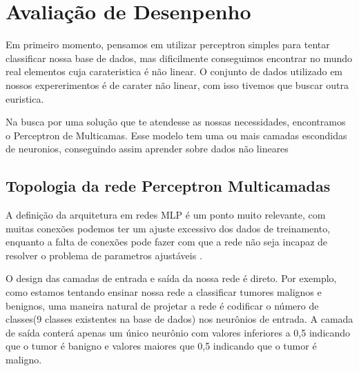 \documentclass[conference]{IEEEtran}
\begin{document}
	
	
\section{Avaliação de Desenpenho}
    
    Em primeiro momento, pensamos em utilizar perceptron simples para tentar classificar nossa base de dados, mas 
    dificilmente conseguimos encontrar no mundo real elementos cuja carateristica é não linear. O conjunto de dados utilizado em nossos expererimentos é de carater não linear, com isso tivemos que buscar outra euristica.
    
    Na busca por uma solução que te atendesse as nossas necessidades, encontramos o Perceptron de Multicamas. Esse modelo tem uma ou mais camadas escondidas de neuronios, conseguindo assim aprender sobre dados não lineares
    
    \subsection{Topologia da rede Perceptron Multicamadas}
    
    
    A definição da arquitetura em redes MLP é um ponto muito relevante, 
    com muitas conexões podemos ter um ajuste excessivo dos dados de treinamento, enquanto a falta de conexões pode fazer com que a rede não seja incapaz de resolver o problema de parametros ajustáveis \cite{b7}.

    O design das camadas de entrada e saída da nossa rede é direto. Por exemplo, como estamos tentando ensinar nossa rede a classificar tumores malignos e benignos, uma maneira natural de projetar a rede é codificar o número de classes(9 classes existentes na base de dados) nos neurônios de entrada. A camada de saída conterá apenas um único neurônio com valores inferiores a 0,5 indicando que  o tumor é banigno e valores maiores que 0,5 indicando que o tumor é maligno.
    
\end{document}
